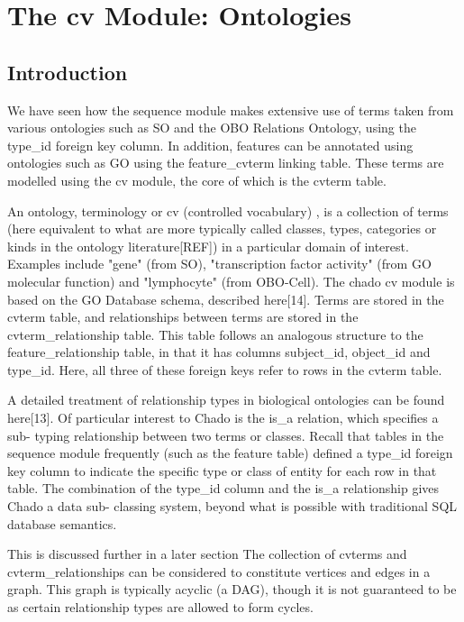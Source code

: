 \chapter{The cv Module: Ontologies}

\section{Introduction}

We have seen how the sequence module makes extensive use of terms
taken from various ontologies such as SO and the OBO Relations
Ontology, using the type\_id foreign key column. In addition, features
can be annotated using ontologies such as GO using the feature\_cvterm
linking table. These terms are modelled using the cv module, the core
of which is the cvterm table.

An ontology, terminology or cv (controlled vocabulary) , is a
collection of terms (here equivalent to what are more typically called
classes, types, categories or kinds in the ontology literature[REF])
in a particular domain of interest. Examples include "gene" (from SO),
"transcription factor activity" (from GO molecular function) and
"lymphocyte" (from OBO-Cell).  The chado cv module is based on the GO
Database schema, described here[14].  Terms are stored in the cvterm
table, and relationships between terms are stored in the
cvterm\_relationship table. This table follows an analogous structure
to the feature\_relationship table, in that it has columns subject\_id,
object\_id and type\_id. Here, all three of these foreign keys refer to
rows in the cvterm table.

A detailed treatment of relationship types in biological ontologies
can be found here[13]. Of particular interest to Chado is the is\_a
relation, which specifies a sub- typing relationship between two terms
or classes. Recall that tables in the sequence module frequently (such
as the feature table) defined a type\_id foreign key column to indicate
the specific type or class of entity for each row in that table. The
combination of the type\_id column and the is\_a relationship gives
Chado a data sub- classing system, beyond what is possible with
traditional SQL database semantics.

This is discussed further in a later section The collection of
cvterms and cvterm\_relationships can be considered to constitute
vertices and edges in a graph. This graph is typically acyclic (a
DAG), though it is not guaranteed to be as certain relationship types
are allowed to form cycles.

